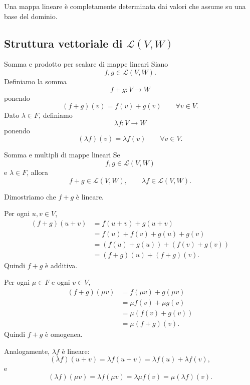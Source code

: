 \documentclass[a4paper]{article}
\begin{document}
\begin{snippetremark}{}
    Una mappa lineare è completamente determinata dai valori che assume su una base del dominio.
\end{snippetremark}

\subsection{Struttura vettoriale di \texorpdfstring{\(\mathcal{L}(V,W)\)}{L(V,W)}}

\begin{snippetdefinition}{Somma e prodotto per scalare di mappe lineari}
    Siano
    \[
        f,g\in\mathcal{L}(V,W).
    \]
    Definiamo la somma
    \[
        f+g:V\to W
    \]
    ponendo
    \[
        (f+g)(v)=f(v)+g(v)
        \qquad
        \forall v\in V.
    \]
    Dato \(\lambda\in F\), definiamo
    \[
        \lambda f:V\to W
    \]
    ponendo
    \[
        (\lambda f)(v)=\lambda f(v)
        \qquad
        \forall v\in V.
    \]
\end{snippetdefinition}

\begin{snippetproposition}{Somma e multipli di mappe lineari}
    Se
    \[
        f,g\in\mathcal{L}(V,W)
    \]
    e \(\lambda\in F\), allora
    \[
        f+g\in\mathcal{L}(V,W),
        \qquad
        \lambda f\in\mathcal{L}(V,W).
    \]
\end{snippetproposition}

\begin{snippetproof}{}
    Dimostriamo che \(f+g\) è lineare.

    Per ogni \(u,v\in V\),
    \begin{align*}
        (f+g)(u+v)
        &=f(u+v)+g(u+v)\\
        &=f(u)+f(v)+g(u)+g(v)\\
        &=(f(u)+g(u))+(f(v)+g(v))\\
        &=(f+g)(u)+(f+g)(v).
    \end{align*}
    Quindi \(f+g\) è additiva.

    Per ogni \(\mu\in F\) e ogni \(v\in V\),
    \begin{align*}
        (f+g)(\mu v)
        &=f(\mu v)+g(\mu v)\\
        &=\mu f(v)+\mu g(v)\\
        &=\mu(f(v)+g(v))\\
        &=\mu(f+g)(v).
    \end{align*}
    Quindi \(f+g\) è omogenea.

    Analogamente, \(\lambda f\) è lineare:
    \[
        (\lambda f)(u+v)=\lambda f(u+v)=\lambda f(u)+\lambda f(v),
    \]
    e
    \[
        (\lambda f)(\mu v)=\lambda f(\mu v)=\lambda\mu f(v)=\mu(\lambda f)(v).
    \]
\end{snippetproof}
\end{document}
